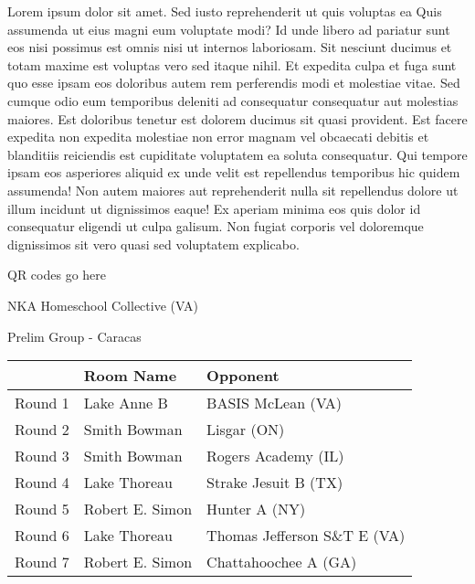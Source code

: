 \documentclass{article}%
\begin{document}
\vspace*{8pt}%
\linebreak%
\newline%
\newline%
Lorem ipsum dolor sit amet. Sed iusto reprehenderit ut quis voluptas ea Quis assumenda ut eius magni eum voluptate modi? Id unde libero ad pariatur sunt eos nisi possimus est omnis nisi ut internos laboriosam. Sit nesciunt ducimus et totam maxime est voluptas vero sed itaque nihil. Et expedita culpa et fuga sunt quo esse ipsam eos doloribus autem rem perferendis modi et molestiae vitae.\newline%
\newline%
Sed cumque odio eum temporibus deleniti ad consequatur consequatur aut molestias maiores. Est doloribus tenetur est dolorem ducimus sit quasi provident. Est facere expedita non expedita molestiae non error magnam vel obcaecati debitis et blanditiis reiciendis est cupiditate voluptatem ea soluta consequatur. Qui tempore ipsam eos asperiores aliquid ex unde velit est repellendus temporibus hic quidem assumenda!\newline%
\newline%
Non autem maiores aut reprehenderit nulla sit repellendus dolore ut illum incidunt ut dignissimos eaque! Ex aperiam minima eos quis dolor id consequatur eligendi ut culpa galisum. Non fugiat corporis vel doloremque dignissimos sit vero quasi sed voluptatem explicabo.\newline%
\newline%
%
\vspace*{30pt}%
\begin{center}%
\begin{Huge}%
QR codes go here%
\end{Huge}%
\end{center}%
\newpage%
%
\begin{center}%
\begin{Huge}%
NKA Homeschool Collective (VA)%
\end{Huge}%
\vspace*{8pt}%
\linebreak%
\begin{Large}%
Prelim Group {-} Caracas%
\end{Large}%
\end{center}%
\begin{tabularx}{\textwidth}{|c|Y|Y|}%
\hline%
&Room Name&Opponent\\%
\hline%
Round 1&Lake Anne B&BASIS McLean (VA)\\%
Round 2&Smith Bowman&Lisgar (ON)\\%
Round 3&Smith Bowman&Rogers Academy (IL)\\%
Round 4&Lake Thoreau&Strake Jesuit B (TX)\\%
Round 5&Robert E. Simon&Hunter A (NY)\\%
Round 6&Lake Thoreau&Thomas Jefferson S\&T E (VA)\\%
Round 7&Robert E. Simon&Chattahoochee A (GA)\\%
\hline%
\end{tabularx}%
\end{document}
